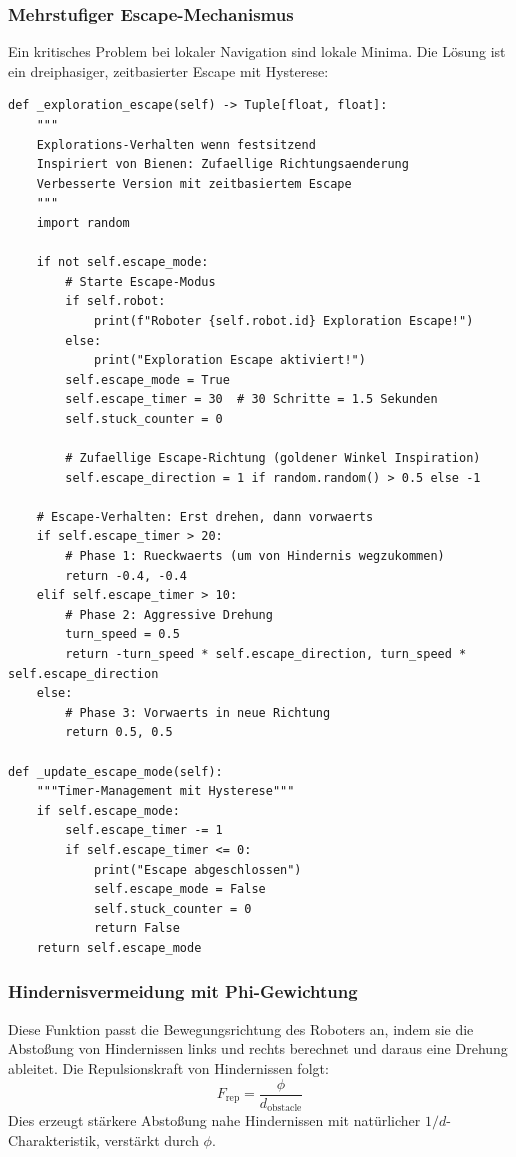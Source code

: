 ﻿\documentclass[a4paper,12pt]{article}
\theoremstyle{definition}
\begin{document}
\subsubsection{Mehrstufiger Escape-Mechanismus}

Ein kritisches Problem bei lokaler Navigation sind lokale Minima. Die Lösung ist ein dreiphasiger, zeitbasierter Escape mit Hysterese:

\begin{lstlisting}[style=pythonstyle, caption={Dreiphasiger Exploration-Escape}]
def _exploration_escape(self) -> Tuple[float, float]:
    """
    Explorations-Verhalten wenn festsitzend
    Inspiriert von Bienen: Zufaellige Richtungsaenderung
    Verbesserte Version mit zeitbasiertem Escape
    """
    import random
    
    if not self.escape_mode:
        # Starte Escape-Modus
        if self.robot:
            print(f"Roboter {self.robot.id} Exploration Escape!")
        else:
            print("Exploration Escape aktiviert!")
        self.escape_mode = True
        self.escape_timer = 30  # 30 Schritte = 1.5 Sekunden
        self.stuck_counter = 0
        
        # Zufaellige Escape-Richtung (goldener Winkel Inspiration)
        self.escape_direction = 1 if random.random() > 0.5 else -1
    
    # Escape-Verhalten: Erst drehen, dann vorwaerts
    if self.escape_timer > 20:
        # Phase 1: Rueckwaerts (um von Hindernis wegzukommen)
        return -0.4, -0.4
    elif self.escape_timer > 10:
        # Phase 2: Aggressive Drehung
        turn_speed = 0.5
        return -turn_speed * self.escape_direction, turn_speed * self.escape_direction
    else:
        # Phase 3: Vorwaerts in neue Richtung
        return 0.5, 0.5

def _update_escape_mode(self):
    """Timer-Management mit Hysterese"""
    if self.escape_mode:
        self.escape_timer -= 1
        if self.escape_timer <= 0:
            print("Escape abgeschlossen")
            self.escape_mode = False
            self.stuck_counter = 0
            return False
    return self.escape_mode
\end{lstlisting}

\subsubsection{Hindernisvermeidung mit Phi-Gewichtung}
Diese Funktion passt die Bewegungsrichtung des Roboters an, indem sie die Abstoßung von Hindernissen links und rechts berechnet und daraus eine Drehung ableitet. Die Repulsionskraft von Hindernissen folgt:
\begin{equation}
F_{\text{rep}} = \frac{\phi}{d_{\text{obstacle}}}
\end{equation}
Dies erzeugt stärkere Abstoßung nahe Hindernissen mit natürlicher $1/d$-Charakteristik, verstärkt durch $\phi$.
\end{document}
